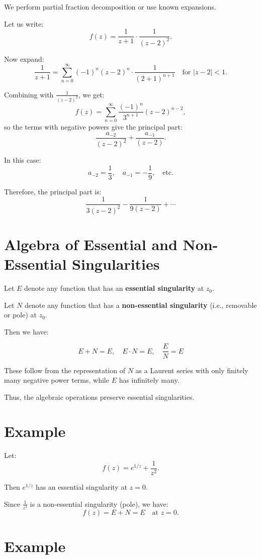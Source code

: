 \documentclass[12pt]{article}
\theoremstyle{definition} %
\theoremstyle{plain} %
\begin{document}
We perform partial fraction decomposition or use known expansions.

Let us write:
\[
f(z) = \frac{1}{z + 1} \cdot \frac{1}{(z - 2)^2}.
\]

Now expand:
\[
\frac{1}{z + 1} = \sum_{n=0}^\infty (-1)^n (z - 2)^n \cdot \frac{1}{(2 + 1)^{n+1}} \quad \text{for } |z - 2| < 1.
\]

Combining with $\frac{1}{(z - 2)^2}$, we get:
\[
f(z) = \sum_{n=0}^\infty \frac{(-1)^n}{3^{n+1}} (z - 2)^{n - 2},
\]
so the terms with negative powers give the principal part:
\[
\frac{a_{-2}}{(z - 2)^2} + \frac{a_{-1}}{(z - 2)}.
\]

In this case:
\[
a_{-2} = \frac{1}{3}, \quad a_{-1} = -\frac{1}{9}, \quad \text{etc.}
\]

Therefore, the principal part is:
\[
\frac{1}{3(z - 2)^2} - \frac{1}{9(z - 2)} + \cdots
\]
\section*{Algebra of Essential and Non-Essential Singularities}

Let $E$ denote any function that has an \textbf{essential singularity} at $z_0$.

Let $N$ denote any function that has a \textbf{non-essential singularity} (i.e., removable or pole) at $z_0$.

Then we have:

\[
E + N = E, \quad E \cdot N = E, \quad \frac{E}{N} = E
\]

These follow from the representation of $N$ as a Laurent series with only finitely many negative power terms, while $E$ has infinitely many.

Thus, the algebraic operations preserve essential singularities.

\section*{Example}

Let:
\[
f(z) = e^{1/z} + \frac{1}{z^2}.
\]

Then $e^{1/z}$ has an essential singularity at $z = 0$.

Since $\frac{1}{z^2}$ is a non-essential singularity (pole), we have:
\[
f(z) = E + N = E \quad \text{at } z = 0.
\]

\section*{Example}
\end{document}
